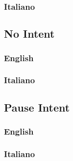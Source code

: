\subsubsection{Italiano}

\begin{itemize}
	
	
\end{itemize}


\subsection{No Intent}
\subsubsection{English}
\begin{itemize}
	
	
\end{itemize}

\subsubsection{Italiano}
\begin{itemize}	
	
\end{itemize}



\subsection{Pause Intent}
\subsubsection{English}
\begin{itemize}
	
	
\end{itemize}

\subsubsection{Italiano}
\begin{itemize}
	
	
\end{itemize}




